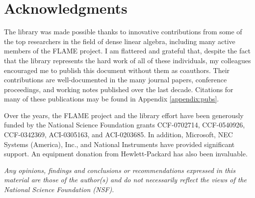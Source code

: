 \section{Acknowledgments}

The \libflame library was made possible thanks to innovative contributions from
some of the top researchers in the field of dense linear algebra, including
many active members of the FLAME project.
I am flattered and grateful that, despite the fact that the library represents
the hard work of all of these individuals, my colleagues encouraged me to
publish this document without them as coauthors.
Their contributions are well-documented in the many journal papers, conference
proceedings, and working notes published over the last decade.
Citations for many of these publications may be found in Appendix \ref{appendix:pubs}.

Over the years, the FLAME project and the \libflame library effort have been
generously funded by the National Science Foundation grants CCF-0702714,
CCF-0540926, CCF-0342369, ACI-0305163, and ACI-0203685.
In addition, Microsoft, NEC Systems (America), Inc., and National Instruments
have provided significant support.
An equipment donation from Hewlett-Packard has also been invaluable.

{\em Any opinions, findings and conclusions or recommendations expressed in this
material are those of the author(s) and do not necessarily reflect the views of
the National Science Foundation (NSF).}


